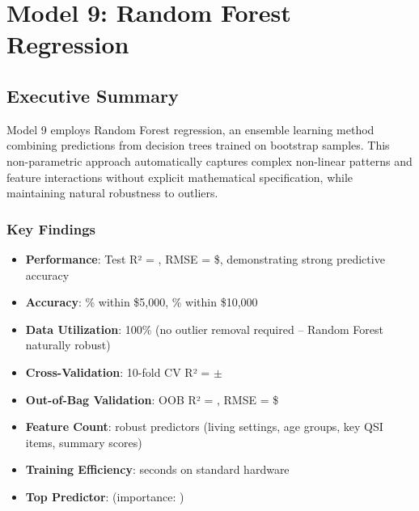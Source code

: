 
\chapter{Model 9: Random Forest Regression}\label{ch:model9}



\section{Executive Summary}

Model 9 employs Random Forest regression, an ensemble learning method combining predictions from \ModelNineNTrees{} decision trees trained on bootstrap samples. This non-parametric approach automatically captures complex non-linear patterns and feature interactions without explicit mathematical specification, while maintaining natural robustness to outliers.

\subsection{Key Findings}

\begin{itemize}
    \item \textbf{Performance}: Test R² = \ModelNineRSquaredTest{}, RMSE = \$\ModelNineRMSETest{}, demonstrating strong predictive accuracy
    \item \textbf{Accuracy}: \ModelNineWithinFiveK{}\% within \$5,000, \ModelNineWithinTenK{}\% within \$10,000
    \item \textbf{Data Utilization}: 100\% (no outlier removal required -- Random Forest naturally robust)
    \item \textbf{Cross-Validation}: 10-fold CV R² = \ModelNineCVMean{} $\pm$ \ModelNineCVStd{}
    \item \textbf{Out-of-Bag Validation}: OOB R² = \ModelNineOOBRSquared{}, RMSE = \$\ModelNineOOBError{}
    \item \textbf{Feature Count}: \ModelNineNumFeatures{} robust predictors (living settings, age groups, key QSI items, summary scores)
    \item \textbf{Training Efficiency}: \ModelNineTrainingTime{} seconds on standard hardware
    \item \textbf{Top Predictor}: \ModelNineTopFeatureOne{} (importance: \ModelNineTopFeatureOneImportance{})
\end{itemize}

